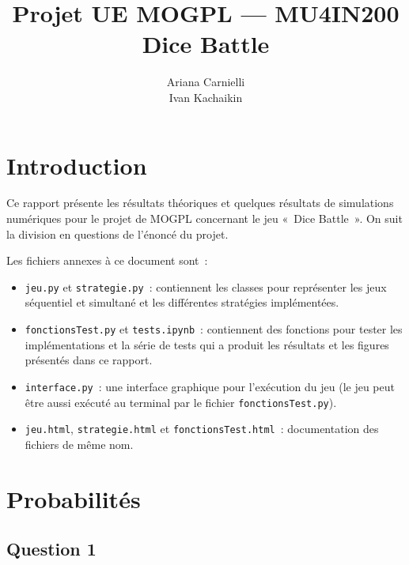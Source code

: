 \documentclass[a4paper,11pt]{amsart}
\theoremstyle{plain}
\begin{document}

\pagestyle{plain}

\vspace*{-15pt}

\title{Projet UE MOGPL --- MU4IN200 \\ Dice Battle}
\author{Ariana Carnielli \\ Ivan Kachaikin}
\date{}

\maketitle



\section{Introduction}

Ce rapport présente les résultats théoriques et quelques résultats de simulations numériques pour le projet de MOGPL concernant le jeu «~Dice Battle~». On suit la division en questions de l'énoncé du projet.

Les fichiers annexes à ce document sont~:
\begin{itemize}[label=\textbullet, nosep]
\item \texttt{jeu.py} et \texttt{strategie.py}~: contiennent les classes pour représenter les jeux séquentiel et simultané et les différentes stratégies implémentées.
\item \texttt{fonctionsTest.py} et \texttt{tests.ipynb}~: contiennent des fonctions pour tester les implémentations et la série de tests qui a produit les résultats et les figures présentés dans ce rapport.
\item \texttt{interface.py}~: une interface graphique pour l'exécution du jeu (le jeu peut être aussi exécuté au terminal par le fichier \texttt{fonctionsTest.py}).
\item \texttt{jeu.html}, \texttt{strategie.html} et \texttt{fonctionsTest.html}~: documentation des fichiers de même nom.
\end{itemize}

\section{Probabilités}

\subsection{Question 1}
\end{document}
